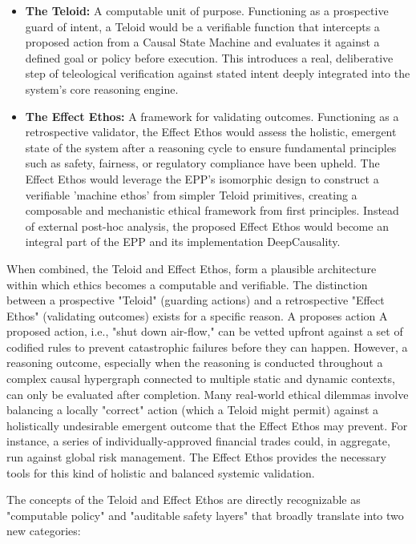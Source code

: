 \begin{itemize}
    \item \textbf{The Teloid:} A computable unit of purpose. Functioning as a prospective guard of intent, a Teloid would be a
    verifiable function that intercepts a proposed action from a Causal State Machine and evaluates it against a defined
    goal or policy before execution. This introduces a real, deliberative step of teleological verification against stated
    intent deeply integrated into the system's core reasoning engine.
    \item \textbf{The Effect Ethos:}  A framework for validating outcomes. Functioning as a retrospective validator, the Effect Ethos
    would assess the holistic, emergent state of the system after a reasoning cycle to ensure fundamental principles such
    as safety, fairness, or regulatory compliance have been upheld. The Effect Ethos would leverage the EPP's isomorphic
    design to construct a verifiable 'machine ethos' from simpler Teloid primitives, creating a composable and mechanistic
    ethical framework from first principles. Instead of external post-hoc analysis, the proposed Effect Ethos would become
    an integral part of the EPP and its implementation DeepCausality.
\end{itemize}

When combined, the Teloid and Effect Ethos, form a plausible architecture within which ethics becomes a computable and
verifiable. The distinction between a prospective "Teloid" (guarding actions) and a retrospective "Effect Ethos"
(validating outcomes) exists for a specific reason. A proposes action A proposed action, i.e., "shut down air-flow,"
can be vetted upfront against a set of codified rules to prevent catastrophic failures before they can happen.
However, a reasoning outcome, especially when the reasoning is conducted throughout a complex causal hypergraph
connected to multiple static and dynamic contexts, can only be evaluated after completion.
Many real-world ethical dilemmas involve balancing a locally "correct" action (which a Teloid might permit) against a
holistically undesirable emergent outcome that the Effect Ethos may prevent. For instance, a series of
individually-approved financial trades could, in aggregate, run against global risk management.
The Effect Ethos provides the necessary tools for this kind of holistic and balanced systemic validation.

The concepts of the Teloid and Effect Ethos are directly recognizable as "computable policy" and "auditable safety
layers" that broadly translate into two new categories:

